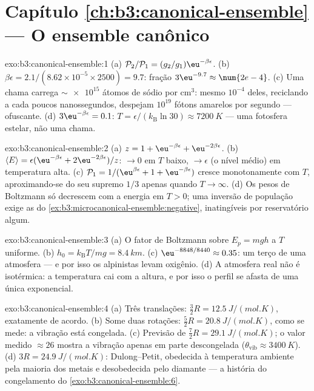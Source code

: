 \section*{Capítulo \ref{ch:b3:canonical-ensemble} --- O ensemble canônico}

\begin{solution}{exo:b3:canonical-ensemble:1}
(a) $\mathcal P_2/\mathcal P_1 = (g_2/g_1)\eu^{-\beta\epsilon}$.
(b) $\beta\epsilon = 2.1/(8.62\times10^{-5} \times 2500) = 9.7$:
fração $3\eu^{-9.7} \approx \num{2e-4}$. (c) Uma chama carrega
$\sim\num{e15}$ átomos de sódio por cm$^3$: mesmo $10^{-4}$ deles,
reciclando a cada poucos nanossegundos, despejam $10^{19}$ fótons
amarelos por segundo --- ofuscante. (d) $3\eu^{-\beta\epsilon} = 0.1$:
$T = \epsilon/(k_{\text{B}}\ln30) \approx \qty{7200}{K}$ --- uma
fotosfera estelar, não uma chama.
\end{solution}

\begin{solution}{exo:b3:canonical-ensemble:2}
(a) $z = 1 + \eu^{-\beta\epsilon} + \eu^{-2\beta\epsilon}$. (b)
$\langle E\rangle = \epsilon(\eu^{-\beta\epsilon} +
2\eu^{-2\beta\epsilon})/z$: $\to 0$ em $T$ baixo, $\to \epsilon$
(o nível médio) em temperatura alta. (c) $\mathcal P_1 = 1/(\eu^{\beta
\epsilon} + 1 + \eu^{-\beta\epsilon})$ cresce monotonamente com
$T$, aproximando-se do seu supremo $1/3$ apenas quando $T \to \infty$.
(d) Os pesos de Boltzmann só decrescem com a energia em $T > 0$; uma
inversão de população exige as  do
\cref{ex:b3:microcanonical-ensemble:negative}, inatingíveis por
reservatório algum.
\end{solution}

\begin{solution}{exo:b3:canonical-ensemble:3}
(a) O fator de Boltzmann sobre $E_p = mgh$ a $T$ uniforme. (b) $h_0 =
k_{\text{B}}T/mg = \qty{8.4}{km}$. (c) $\eu^{-8848/8440} \approx
0.35$: um terço de uma atmosfera --- e por isso os alpinistas levam
oxigênio. (d) A atmosfera real não é isotérmica: a temperatura cai com
a altura, e por isso o perfil se afasta de uma única exponencial.
\end{solution}

\begin{solution}{exo:b3:canonical-ensemble:4}
(a) Três translações: $\tfrac32 R = \qty{12.5}{J/(mol.K)}$, exatamente
de acordo. (b) Some duas rotações: $\tfrac52 R =
\qty{20.8}{J/(mol.K)}$, como se mede: a vibração está congelada. (c)
Previsão de $\tfrac72 R = \qty{29.1}{J/(mol.K)}$; o valor medido
$\approx26$ mostra a vibração apenas em parte descongelada ($\theta_{\text{vib}}
\approx \qty{3400}{K}$). (d) $3R = \qty{24.9}{J/(mol.K)}$:
Dulong--Petit, obedecida à temperatura ambiente pela maioria dos metais
e desobedecida pelo diamante --- a história do congelamento do
\cref{exo:b3:canonical-ensemble:6}.
\end{solution}

